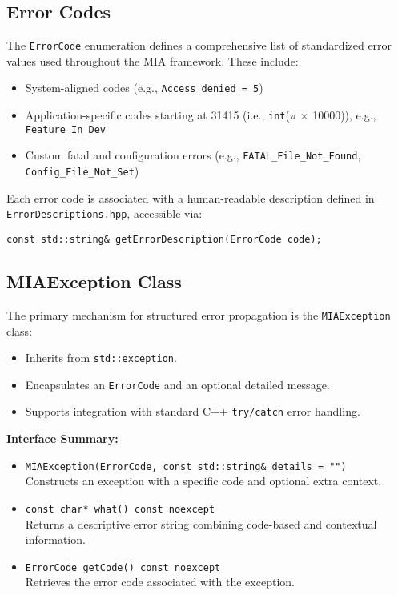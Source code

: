 \subsection*{Error Codes}
The \texttt{ErrorCode} enumeration defines a comprehensive list of standardized error values used throughout the MIA framework. These include:
\begin{itemize}
	\item System-aligned codes (e.g., \texttt{Access\_denied = 5})
	\item Application-specific codes starting at 31415 (i.e., \texttt{int}($\pi$ × 10000)), e.g., \texttt{Feature\_In\_Dev}
	\item Custom fatal and configuration errors (e.g., \texttt{FATAL\_File\_Not\_Found}, \texttt{Config\_File\_Not\_Set})
\end{itemize}

Each error code is associated with a human-readable description defined in \texttt{ErrorDescriptions.hpp}, accessible via:
\begin{lstlisting}[style=cppstyle]
const std::string& getErrorDescription(ErrorCode code);
\end{lstlisting}

\subsection*{MIAException Class}
The primary mechanism for structured error propagation is the \texttt{MIAException} class:
\begin{itemize}
	\item Inherits from \texttt{std::exception}.
	\item Encapsulates an \texttt{ErrorCode} and an optional detailed message.
	\item Supports integration with standard C++ \texttt{try/catch} error handling.
\end{itemize}

\textbf{Interface Summary:}
\begin{itemize}
	\item \texttt{MIAException(ErrorCode, const std::string\& details = "")} \\
	Constructs an exception with a specific code and optional extra context.
	\item \texttt{const char* what() const noexcept} \\
	Returns a descriptive error string combining code-based and contextual information.
	\item \texttt{ErrorCode getCode() const noexcept} \\
	Retrieves the error code associated with the exception.
\end{itemize}

